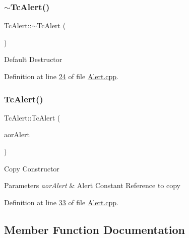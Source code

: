 \subsubsection{\texorpdfstring{$\sim$\+Tc\+Alert()}{~TcAlert()}}
{\footnotesize\ttfamily Tc\+Alert\+::$\sim$\+Tc\+Alert (\begin{DoxyParamCaption}\item[{void}]{ }\end{DoxyParamCaption})}

Default Destructor 

Definition at line \mbox{\hyperlink{_alert_8cpp_source_l00024}{24}} of file \mbox{\hyperlink{_alert_8cpp_source}{Alert.\+cpp}}.

\mbox{\label{class_g_n_common_1_1_n_notification_1_1_tc_alert_a75120f1735cec51fe7f4afa519bd631b}} 
\subsubsection{\texorpdfstring{Tc\+Alert()}{TcAlert()}\hspace{0.1cm}{\footnotesize\ttfamily [2/2]}}
{\footnotesize\ttfamily Tc\+Alert\+::\+Tc\+Alert (\begin{DoxyParamCaption}\item[{const \mbox{\hyperlink{class_g_n_common_1_1_n_notification_1_1_tc_alert}{Tc\+Alert}} \&}]{aor\+Alert }\end{DoxyParamCaption})}

Copy Constructor 
\begin{DoxyParams}{Parameters}
{\em aor\+Alert} & Alert Constant Reference to copy \\
\hline
\end{DoxyParams}


Definition at line \mbox{\hyperlink{_alert_8cpp_source_l00033}{33}} of file \mbox{\hyperlink{_alert_8cpp_source}{Alert.\+cpp}}.



\subsection{Member Function Documentation}
\mbox{\label{class_g_n_common_1_1_n_notification_1_1_tc_alert_a4eeace6aa167a1b9b9a98487eee0ddb2}} 
